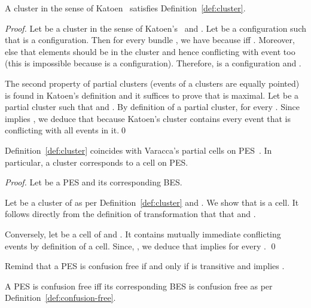 \documentclass{llncs}
\newcommand{\<}{\langle}
\renewcommand{\>}{\rangle}
\begin{document}
\begin{proposition}
A cluster in the sense of Katoen~\cite{Kat96} satisfies Definition~\ref{def:cluster}.
\end{proposition}

\begin{proof}
Let  be a cluster in the sense of Katoen's~\cite{Kat96} and . Let  be a configuration such that  is a configuration. Then for every bundle , we have  because  iff . Moreover,  else that elements should be in the cluster  and hence conflicting with event  too (this is impossible because  is a configuration). Therefore,  is a configuration and . 

The second property of partial clusters (events of a clusters are equally pointed) is found in Katoen's definition and it suffices to prove that  is maximal. Let  be a partial cluster such that  and . By definition of a partial cluster,  for every . Since  implies , we deduce that  because Katoen's cluster contains every event that is conflicting with all events in it.\qed
\end{proof}




\begin{proposition}\label{pro:cluster-cell}
Definition~\ref{def:cluster} coincides with Varacca's partial cells on PES~\cite{Var03}. In particular, a cluster corresponds to a cell on PES.
\end{proposition}

\begin{proof}
Let  be a PES and  its corresponding BES. 

Let  be a cluster of  as per Definition~\ref{def:cluster} and . We show that  is a cell. It follows directly from the definition of transformation that that  and . 

Conversely, let  be a cell of  and . It contains mutually immediate conflicting events by definition of a cell. Since, , we deduce that  implies  for every . \qed
\end{proof}

Remind that a PES is confusion free if and only if  is transitive and  implies .

\begin{proposition}
A PES is confusion free iff its corresponding BES is confusion free as per Definition~\ref{def:confusion-free}.
\end{proposition}
\end{document}
